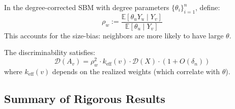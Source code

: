 \begin{theorem}
\label{thm:dcsbm_discriminability}
In the degree-corrected SBM with degree parameters $\{\theta_i\}_{i=1}^n$, define:
\begin{equation}
    \rho_w := \frac{\mathbb{E}[\theta_u Y_u \mid Y_v]}{\mathbb{E}[\theta_u \mid Y_v]}
\end{equation}
This accounts for the size-bias: neighbors are more likely to have large $\theta$.

The discriminability satisfies:
\begin{equation}
    \mathcal{D}(A_v) = \rho_w^2 \cdot k_{\mathrm{eff}}(v) \cdot \mathcal{D}(X) \cdot (1 + O(\delta_n))
\end{equation}
where $k_{\mathrm{eff}}(v)$ depends on the realized weights (which correlate with $\theta$).
\end{theorem}

\subsection{Summary of Rigorous Results}
\label{subsec:summary_rigorous}

